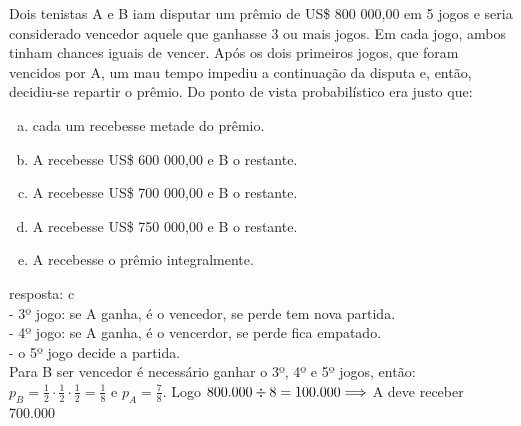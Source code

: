 \begin{ex}
 	Dois tenistas A e B iam disputar um prêmio de US\$ 800 000,00 em 5 jogos e seria considerado vencedor aquele que ganhasse 3 ou mais jogos. Em cada jogo, ambos tinham chances iguais de vencer. Após os dois primeiros jogos, que foram vencidos por A, um mau tempo impediu a continuação da disputa e, então, decidiu-se repartir o prêmio. Do ponto de vista probabilístico era justo que:
    \begin{enumerate}[(a)]
    \item cada um recebesse metade do prêmio.
    \item A recebesse US\$ 600 000,00 e B o restante.
    \item A recebesse US\$ 700 000,00 e B o restante.
    \item A recebesse US\$ 750 000,00 e B o restante.
    \item A recebesse o prêmio integralmente.
    \end{enumerate}
      \begin{sol}
        resposta: c \\
        - 3º jogo: se A ganha, é o vencedor, se  perde tem nova partida. \\
        - 4º jogo: se A ganha, é o vencerdor, se perde fica empatado. \\
        - o 5º jogo decide a partida.\\
        Para B ser vencedor é necessário ganhar o 3º, 4º e 5º jogos, então:\\ $p_B=\frac{1}{2}\cdot\frac{1}{2}\cdot\frac{1}{2}=\frac{1}{8}$ e $p_A=\frac{7}{8}$. Logo $800.000 \div 8 = 100.000 \\ \Longrightarrow $ A deve receber 700.000
        
      \end{sol}
\end{ex}